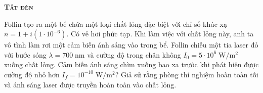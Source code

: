 \begin{problem}{\textbf{\textsc{Tắt đèn}}} 

Follin tạo ra một bể chứa một loại chất lỏng đặc biệt với chỉ số khúc xạ $n = 1 + i(1\cdot 10^{-6}).$ Có vẻ hơi phức tạp. Khi làm việc với chất lỏng này, anh ta vô tình làm rơi một cảm biến ánh sáng vào trong bể. Follin chiếu một tia laser đỏ với bước sóng $\lambda=700\;\text{nm}$ và cường độ trong chân không $I_0 = 5\cdot 10^{6}\;\mathrm{W/m^2}$ xuống chất lỏng. Cảm biến ánh sáng chìm xuống bao xa trước khi phát hiện được cường độ nhỏ hơn $I_f = 10^{-10}\;\mathrm{W/m^2}$? Giả sử rằng phòng thí nghiệm hoàn toàn tối và ánh sáng laser được truyền hoàn toàn vào chất lỏng.  

\end{problem}
